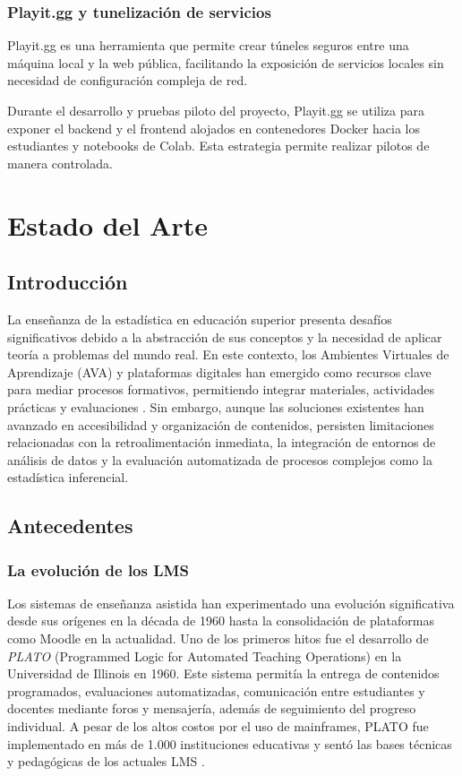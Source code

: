 \documentclass[letter,oneside,12pt,spanish]{report}
\begin{document}
\subsection{Playit.gg y tunelización de servicios}

Playit.gg es una herramienta que permite crear túneles seguros entre una máquina local y la web pública, facilitando la exposición de servicios locales sin necesidad de configuración compleja de red.

Durante el desarrollo y pruebas piloto del proyecto, Playit.gg se utiliza para exponer el backend y el frontend alojados en contenedores Docker hacia los estudiantes y notebooks de Colab. Esta estrategia permite realizar pilotos de manera controlada.


\newpage


\chapter{Estado del Arte}

\section{Introducción}
La enseñanza de la estadística en educación superior presenta desafíos significativos debido a la abstracción de sus conceptos y la necesidad de aplicar teoría a problemas del mundo real. En este contexto, los Ambientes Virtuales de Aprendizaje (AVA) y plataformas digitales han emergido como recursos clave para mediar procesos formativos, permitiendo integrar materiales, actividades prácticas y evaluaciones \parencite{AlHaddad2024}. Sin embargo, aunque las soluciones existentes han avanzado en accesibilidad y organización de contenidos, persisten limitaciones relacionadas con la retroalimentación inmediata, la integración de entornos de análisis de datos y la evaluación automatizada de procesos complejos como la estadística inferencial.

\section{Antecedentes}

\subsection{La evolución de los LMS}
Los sistemas de enseñanza asistida han experimentado una evolución significativa desde sus orígenes en la década de 1960 hasta la consolidación de plataformas como Moodle en la actualidad. Uno de los primeros hitos fue el desarrollo de \textit{PLATO} (Programmed Logic for Automated Teaching Operations) en la Universidad de Illinois en 1960. Este sistema permitía la entrega de contenidos programados, evaluaciones automatizadas, comunicación entre estudiantes y docentes mediante foros y mensajería, además de seguimiento del progreso individual. A pesar de los altos costos por el uso de mainframes, PLATO fue implementado en más de 1.000 instituciones educativas y sentó las bases técnicas y pedagógicas de los actuales LMS \parencite{Woolley2016}.
\end{document}
